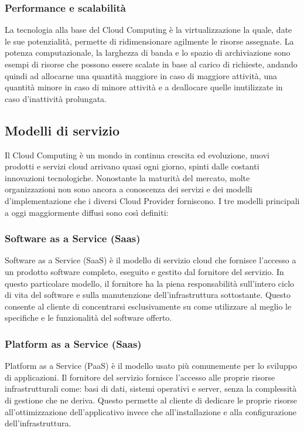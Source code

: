 \subsubsection{Performance e scalabilità}
La tecnologia alla base del Cloud Computing è la virtualizzazione la quale, date le sue potenzialità, permette di ridimensionare agilmente le risorse assegnate. La potenza computazionale, la larghezza di banda e lo spazio di archiviazione sono esempi di risorse che possono essere scalate in base al carico di richieste, andando quindi ad allocarne una quantità maggiore in caso di maggiore attività, una quantità minore in caso di minore attività e a deallocare quelle inutilizzate in caso d'inattività prolungata.

\subsection{Modelli di servizio}
Il Cloud Computing è un mondo in continua crescita ed evoluzione, nuovi prodotti e servizi cloud arrivano quasi ogni giorno, spinti dalle costanti innovazioni tecnologiche.
Nonostante la maturità del mercato, molte organizzazioni non sono ancora a conoscenza dei servizi e dei modelli d'implementazione che i diversi Cloud Provider forniscono.
I tre modelli principali a oggi maggiormente diffusi sono così definiti:

\subsubsection{Software as a Service (Saas)}
Software as a Service (SaaS) è il modello di servizio cloud che fornisce l'accesso a un prodotto software completo, eseguito e gestito dal fornitore del servizio.
In questo particolare modello, il fornitore ha la piena responsabilità sull'intero ciclo di vita del software e sulla manutenzione dell'infrastruttura sottostante. Questo consente al cliente di concentrarsi esclusivamente su come utilizzare al meglio le specifiche e le funzionalità del software offerto.

\subsubsection{Platform as a Service (Saas)}
Platform as a Service (PaaS) è il modello usato più comunemente per lo sviluppo di applicazioni. Il fornitore del servizio fornisce l'accesso alle proprie risorse infrastrutturali come: basi di dati, sistemi operativi e server, senza la complessità di gestione che ne deriva. Questo permette al cliente di dedicare le proprie risorse all'ottimizzazione dell'applicativo invece che all'installazione e alla configurazione dell'infrastruttura.

